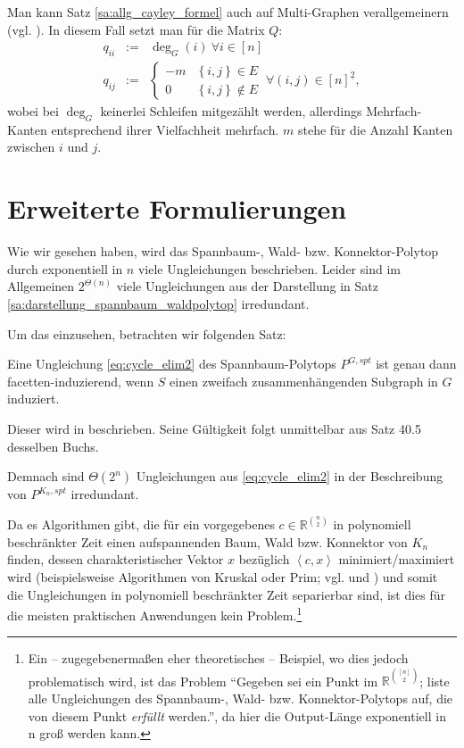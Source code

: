 \documentclass[10p,a4paper,BCOR = 12mm, DIV=15]{scrbook}
\begin{document}
\begin{Bem}
Man kann Satz \ref{sa:allg_cayley_formel} auch auf Multi-Graphen verallgemeinern (vgl. \citep{matousek2007diskrete}). In diesem Fall setzt man für die Matrix $Q$:
\begin{eqnarray*}
q_{i i} & := & \deg_G\left(i\right)\ \forall i \in \left[n\right] \\
q_{i j} & := & \begin{cases}
-m & \left\{i, j\right\} \in E \\
0 & \left\{i, j\right\} \notin E
\end{cases}\ \forall \left(i, j\right) \in \left[n\right]^{\underline{2}},
\end{eqnarray*}
wobei bei $\deg_G$ keinerlei Schleifen mitgezählt werden, allerdings Mehrfach-Kanten entsprechend ihrer Vielfachheit mehrfach. $m$ stehe für die Anzahl Kanten zwischen $i$ und $j$.
\end{Bem}

\section{Erweiterte Formulierungen}

Wie wir gesehen haben, wird das Spannbaum-, Wald- bzw. Konnektor-Polytop durch exponentiell in $n$ viele Ungleichungen beschrieben. Leider sind im Allgemeinen $2^{\Theta\left(n\right)}$ viele Ungleichungen aus der Darstellung in Satz \ref{sa:darstellung_spannbaum_waldpolytop} irredundant.

Um das einzusehen, betrachten wir folgenden Satz:

\begin{Sa}
Eine Ungleichung \eqref{eq:cycle_elim2} des Spannbaum-Polytops $P^{G, spt}$ ist genau dann facetten-induzierend, wenn $S$ einen zweifach zusammenhängenden Subgraph in $G$ induziert.
\end{Sa}

Dieser wird in \citep[S:~862]{schrijver2003combinatorial} beschrieben. Seine Gültigkeit folgt unmittelbar aus Satz 40.5 desselben Buchs.

Demnach sind $\Theta\left(2^n\right)$ Ungleichungen aus \eqref{eq:cycle_elim2} in der Beschreibung von $P^{K_n, spt}$ irredundant.

Da es Algorithmen gibt, die für ein vorgegebenes $c \in \mathbb{R}^{n \choose 2}$ in polynomiell beschränkter Zeit einen aufspannenden Baum, Wald bzw. Konnektor von $K_n$ finden, dessen charakteristischer Vektor $x$ bezüglich $\left\langle c, x\right\rangle$ minimiert/maximiert wird (beispielsweise Algorithmen von Kruskal oder Prim; vgl. \cite{korte2012combinatorial} und \cite{schrijver2003combinatorial}) und somit die Ungleichungen in polynomiell beschränkter Zeit separierbar sind, ist dies für die meisten praktischen Anwendungen kein Problem.\footnote{Ein -- zugegebenermaßen eher theoretisches -- Beispiel, wo dies jedoch problematisch wird, ist das Problem "`Gegeben sei ein Punkt im $\mathbb{R}^{\left[n\right] \choose 2}$; liste alle Ungleichungen des Spannbaum-, Wald- bzw. Konnektor-Polytops auf, die von diesem Punkt \emph{erfüllt} werden."', da hier die Output-Länge exponentiell in n groß werden kann.}
\end{document}
